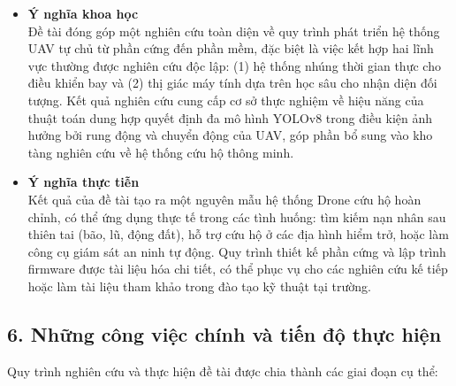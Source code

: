 \begin{itemize}
    \item \textbf{Ý nghĩa khoa học}\\
    Đề tài đóng góp một nghiên cứu toàn diện về quy trình phát triển hệ thống UAV tự chủ từ phần cứng đến phần mềm, đặc biệt là việc kết hợp hai lĩnh vực thường được nghiên cứu độc lập: (1) hệ thống nhúng thời gian thực cho điều khiển bay và (2) thị giác máy tính dựa trên học sâu cho nhận diện đối tượng. Kết quả nghiên cứu cung cấp cơ sở thực nghiệm về hiệu năng của thuật toán dung hợp quyết định đa mô hình YOLOv8 trong điều kiện ảnh hưởng bởi rung động và chuyển động của UAV, góp phần bổ sung vào kho tàng nghiên cứu về hệ thống cứu hộ thông minh.

    \item \textbf{Ý nghĩa thực tiễn}\\
    Kết quả của đề tài tạo ra một nguyên mẫu hệ thống Drone cứu hộ hoàn chỉnh, có thể ứng dụng thực tế trong các tình huống: tìm kiếm nạn nhân sau thiên tai (bão, lũ, động đất), hỗ trợ cứu hộ ở các địa hình hiểm trở, hoặc làm công cụ giám sát an ninh tự động. Quy trình thiết kế phần cứng và lập trình firmware được tài liệu hóa chi tiết, có thể phục vụ cho các nghiên cứu kế tiếp hoặc làm tài liệu tham khảo trong đào tạo kỹ thuật tại trường.
\end{itemize}

\subsection*{6. Những công việc chính và tiến độ thực hiện}

Quy trình nghiên cứu và thực hiện đề tài được chia thành các giai đoạn cụ thể:


